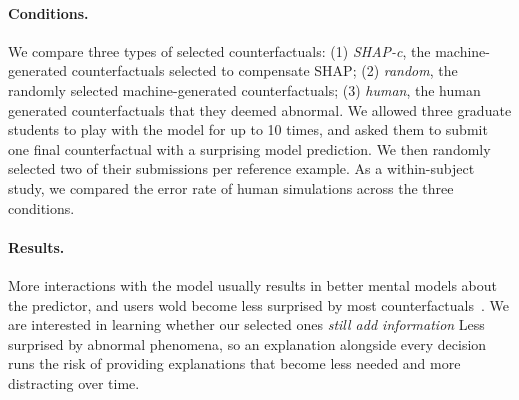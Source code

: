 \paragraph{Conditions.} 
We compare three types of selected counterfactuals:
(1) \emph{SHAP-c}, the machine-generated counterfactuals selected to compensate SHAP; 
(2) \emph{random}, the randomly selected machine-generated counterfactuals; 
(3) \emph{human}, 
the human generated counterfactuals that they deemed abnormal.
We allowed three graduate students to play with the model for up to 10 times, and asked them to submit one final counterfactual with a surprising model prediction.
We then randomly selected two of their submissions per reference example.
As a within-subject study, we compared the error rate of human simulations across the three conditions.


\paragraph{Results.}
More interactions with the model usually results in better mental models about the predictor, and users wold become less surprised by most counterfactuals~\cite{miller}.
We are interested in learning whether our selected ones \emph{still add information}
Less surprised by abnormal phenomena, so an explanation alongside every decision runs the risk of providing explanations that become less needed and more distracting over time.

\begin{comment}
****
The examples generated by BERT.
****

  P: The quarterback of the UTEP football team is about to be tackled by a member of the Wisconsin defensive team.
  H: The quarterback is about to be tackled by the opposing team.
 Pr: entailment
 NP: Another quarterback is about to be tackled by the opposing team.
NPr: neutral
weight:  0.122
flip_unimportant_feature 0.013 {The}

  P: The quarterback of the UTEP football team is about to be tackled by a member of the Wisconsin defensive team.
  H: The quarterback is about to be tackled by the opposing team.
 Pr: entailment
 NP: Jack is about to be tackled by the opposing team.
NPr: neutral
weight:  0.461
flip_unimportant_feature 0.028 {The, quarterback}


  P: The quarterback of the UTEP football team is about to be tackled by a member of the Wisconsin defensive team.
  H: The quarterback is about to be tackled by the opposing team.
 Pr: entailment
 NP: The quarterback is about to be tackled by someone
NPr: entailment
weight:  0.218
unflip_important_feature 0.3 {team, the, ., opposing}

  P: The quarterback of the UTEP football team is about to be tackled by a member of the Wisconsin defensive team.
  H: The quarterback is about to be tackled by the opposing team.
 Pr: entailment
 NP: The quarterback is about to be tackled by the second team.
NPr: entailment
weight:  0.292
unflip_important_feature 0.149 {opposing}


\end{comment}



